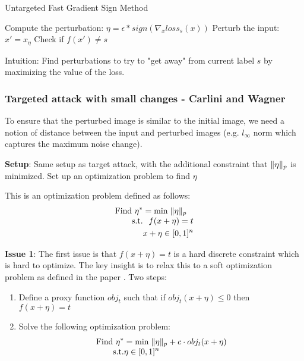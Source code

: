 \documentclass[11pt]{article}
\begin{document}
\begin{algorithm}
\caption{Untargeted Fast Gradient Sign Method}
\begin{algorithmic}[1]
\State Compute the perturbation: $\eta = \epsilon * sign(\nabla_x loss_s(x))$
\State Perturb the input: $x' = x _ \eta$
\State Check if $f(x') \neq s$ 
\end{algorithmic}
\end{algorithm}

\begin{note}
	Intuition: Find perturbations to try to "get away" from current label $s$ by maximizing the value of the loss. 
\end{note}

\subsubsection{Targeted attack with small changes - Carlini and Wagner}
To ensure that the perturbed image is similar to the initial image, we need a notion of distance between the input and perturbed images (e.g. $l_\infty$ norm which captures the maximum noise change). 

\textbf{Setup}: Same setup as target attack, with the additional constraint that $\lVert \eta \rVert_p$ is minimized. Set up an optimization problem to find $\eta$

This is an optimization problem defined as follows:
\[
  \optprob{Find $\eta^*$}{\min}{\norm{\eta}_p}[%
    f(x+\eta) = t \\ x + \eta \in [0, 1]^n
  ]
\]

\textbf{Issue 1}: The first issue is that $f(x + \eta) = t$ is a hard discrete constraint which is hard to optimize. The key insight is to relax this to a soft optimization problem as defined in the paper \cite{carlini2017towards}. Two steps:
\begin{enumerate}
	\item Define a proxy function $obj_t$ such that if $obj_t(x + \eta) \leq 0$ then $f(x + \eta) = t$
	\item Solve the following optimization problem:
	\[
	  \optprob{Find $\eta^*$}{\min}{\norm{\eta}_p + c \cdot obj_t(x + \eta)}[%
	    \eta \in [0, 1]^n
	  ]
	\]
\end{enumerate} 
\end{document}
